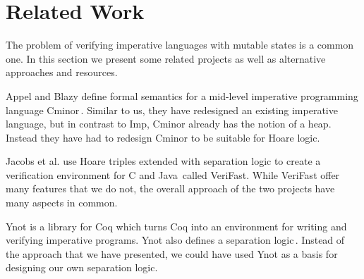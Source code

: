 \section{Related Work}
\label{sec:related_work}
The problem of verifying imperative languages with mutable states is a common one. In this section we present some related projects as well as alternative approaches and resources.

Appel and Blazy define formal semantics for a mid-level imperative programming language Cminor\,\cite{Appel07separationlogic}. Similar to us, they have redesigned an existing imperative language, but in contrast to Imp, Cminor already has the notion of a heap. Instead they have had to redesign Cminor to be suitable for Hoare logic.

Jacobs et al. use Hoare triples extended with separation logic to create a verification environment for C and Java\,\cite{Jacobs:2010:QTV:1947873.1947902} called VeriFast. While VeriFast offer many features that we do not, the overall approach of the two projects have many aspects in common.

Ynot is a library for Coq which turns Coq into an environment for writing and verifying imperative programs. Ynot also defines a separation logic\,\cite{Ynot}. Instead of the approach that we have presented, we could have used Ynot as a basis for designing our own separation logic.